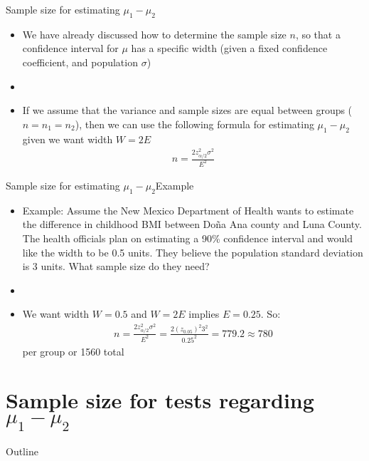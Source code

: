 \documentclass[xcolor=dvipsnames]{beamer}
\begin{document}
\begin{frame}{Sample size for estimating $\mu_1 - \mu_2$}
	\begin{itemize}
		\item We have already discussed how to determine the sample size $n$, so that a confidence interval for $\mu$ has a specific width (given a fixed confidence coefficient, and population $\sigma$)
		\item[]
		\item If we assume that the variance and sample sizes are equal between groups ($n=n_1=n_2$), then we can use the following formula for estimating $\mu_1 - \mu_2$ given we want width $W = 2E$
		\begin{gather*}
			n = \frac{2 z_{\alpha / 2}^2 \sigma^2}{E^2}
		\end{gather*}
	\end{itemize}
\end{frame}

\begin{frame}{Sample size for estimating $\mu_1 - \mu_2$}{Example}
	\begin{itemize}
		\item Example: Assume the New Mexico Department of Health wants to estimate the difference in childhood BMI between Do\~{n}a Ana county and Luna County. The health officials plan on estimating a 90\% confidence interval and would like the width to be 0.5 units. They believe the population standard deviation is 3 units. What sample size do they need?
		\item[]
		\item We want width $W = 0.5$ and $W = 2E$ implies $E = 0.25$. So:
		\begin{gather*}
		n = \frac{2 z_{\alpha / 2}^2 \sigma^2}{E^2} = \frac{2 (z_{0.05})^2 3^2}{0.25^2} = 779.2 \approx 780
		\end{gather*}
		per group or 1560 total
	\end{itemize}
\end{frame}

\section{Sample size for tests regarding $\mu_1 - \mu_2$}
\begin{frame}{Outline}
	\tableofcontents[currentsection,subsectionstyle=show/shaded/hide]
\end{frame}
\end{document}
